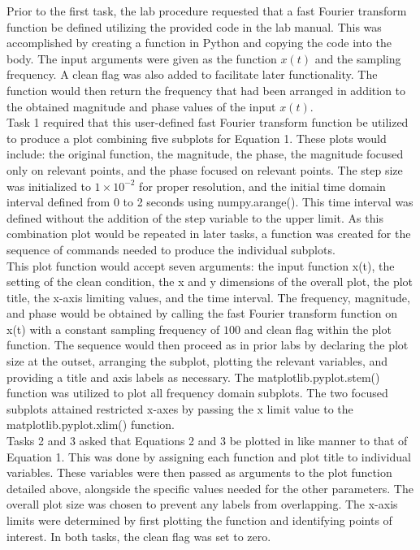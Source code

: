 \documentclass[12pt]{report}
\begin{document}
Prior to the first task, the lab procedure requested that a fast Fourier transform function be defined utilizing the provided code in the lab manual. This was accomplished by creating a function in Python and copying the code into the body. The input arguments were given as the function $ x(t) $ and the sampling frequency. A clean flag was also added to facilitate later functionality. The function would then return the frequency that had been arranged in addition to the obtained magnitude and phase values of the input $ x(t) $. \\ 

Task 1 required that this user-defined fast Fourier transform function be utilized to produce a plot combining five subplots for Equation 1. These plots would include: the original function, the magnitude, the phase, the magnitude focused only on relevant points, and the phase focused on relevant points. The step size was initialized to $ 1\times 10^{-2} $ for proper resolution, and the initial time domain interval defined from 0 to 2 seconds using numpy.arange(). This time interval was defined without the addition of the step variable to the upper limit. As this combination plot would be repeated in later tasks, a function was created for the sequence of commands needed to produce the individual subplots. \\

This plot function would accept seven arguments: the input function x(t), the setting of the clean condition, the x and y dimensions of the overall plot, the plot title, the x-axis limiting values, and the time interval. The frequency, magnitude, and phase would be obtained by calling the fast Fourier transform function on x(t) with a constant sampling frequency of $ 100 $ and clean flag within the plot function. The sequence would then proceed as in prior labs by declaring the plot size at the outset, arranging the subplot, plotting the relevant variables, and providing a title and axis labels as necessary. The matplotlib.pyplot.stem() function was utilized to plot all frequency domain subplots. The two focused subplots attained restricted x-axes by passing the x limit value to the matplotlib.pyplot.xlim() function. \\

Tasks 2 and 3 asked that Equations 2 and 3 be plotted in like manner to that of Equation 1. This was done by assigning each function and plot title to individual variables. These variables were then passed as arguments to the plot function detailed above, alongside the specific values needed for the other parameters. The overall plot size was chosen to prevent any labels from overlapping. The x-axis limits were determined by first plotting the function and identifying points of interest. In both tasks, the clean flag was set to zero. \\
\end{document}
